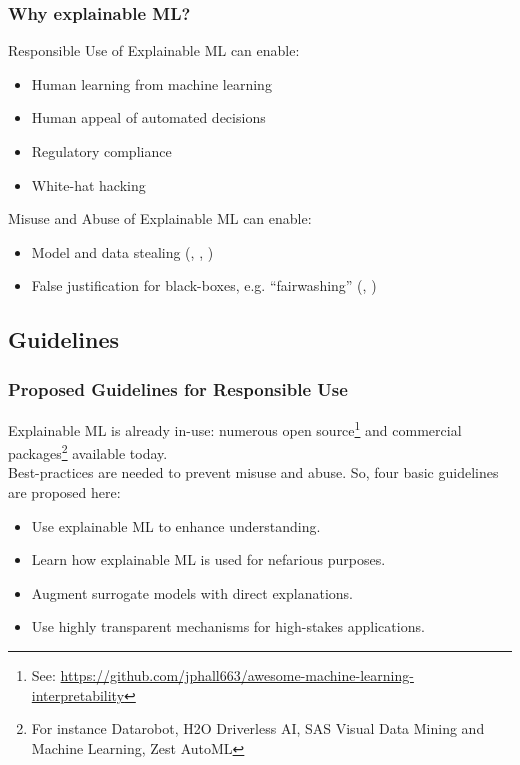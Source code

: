 \documentclass[11pt,
               aspectratio=169,
               hyperref={colorlinks}
               ]{beamer}
\begin{document}

	\begin{frame}
	
		\frametitle{Why explainable ML?}
		\vspace{10pt}
		Responsible Use of Explainable ML can enable:
		\begin{itemize}\footnotesize
			\item Human learning from machine learning
			\item Human appeal of automated decisions
			\item Regulatory compliance
			\item White-hat hacking
		\end{itemize}
		\vspace{5pt}
		Misuse and Abuse of Explainable ML can enable:
		\begin{itemize}\footnotesize
			\item Model and data stealing (\citet{model_stealing}, \citet{membership_inference}, \citet{shokri2019privacy})
			\item False justification for black-boxes, e.g. ``fairwashing'' (\citet{fair_washing}, \citet{please_stop})
		\end{itemize}
		\normalsize
		
	\end{frame}
	
	\subsection{Guidelines}

	\begin{frame}
	
		\frametitle{Proposed Guidelines for Responsible Use}
		
		Explainable ML is already in-use: numerous open source\footnote{\tiny{See: \url{https://github.com/jphall663/awesome-machine-learning-interpretability}}} and commercial packages\footnote{\tiny{For instance  Datarobot, H2O Driverless AI, SAS Visual Data Mining and Machine Learning, Zest AutoML}} available today.\\
		\vspace{5pt}
		Best-practices are needed to prevent misuse and abuse. So, four basic guidelines are proposed here:
		\vspace{5pt}
		\begin{itemize}
			\item Use explainable ML to enhance understanding.
			\item Learn how explainable ML is used for nefarious purposes.
			\item Augment surrogate models with direct explanations.
			\item Use highly transparent mechanisms for high-stakes applications.
		\end{itemize}
		
	\end{frame}
\end{document}
